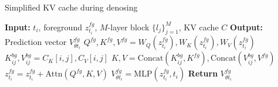\begin{algorithm}[t]
\caption{Simplified KV cache during denosing}
\begin{algorithmic}[1]
\State \textbf{Input:} $t_{i}$, foreground $z^{fg}_{t_{i}}$, $M$-layer block $\{ l_j \}_{j=1}^{M}$, KV cache $C$
\State \textbf{Output:} Prediction vector $V^{fg}_{\theta t_{i}}$
    \State $Q^{fg}, K^{fg}, V^{fg} = W_Q(z^{fg}_{t_{i}}), W_K(z^{fg}_{t_{i}}), W_V(z^{fg}_{t_{i}})$
    \State $K^{bg}_{ij}, V^{bg}_{ij} = C_K[i, j], C_V[i, j]$
    \State $K, V = \text{Concat}(K^{bg}_{ij}, K^{fg}),\text{Concat}(V^{bg}_{ij}, V^{fg})$
    \State $z^{fg}_{t_{i}} = z^{fg}_{t_{i}} + \text{Attn}(Q^{fg}, K, V)$
\EndFor
\State $V^{fg}_{\theta t_{i}} = \text{MLP}(z^{fg}_{t_{i}}, t_{i})$
\State \textbf{Return} $V^{fg}_{\theta t_{i}}$
\end{algorithmic}
\label{algorithm:algorithm2}
\end{algorithm}

